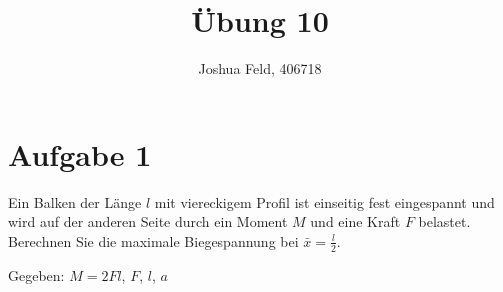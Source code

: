 \documentclass{exercise}
\institute{Lehr- und Forschungsgebiet Kontinuumsmechanik}
\title{Übung 10}
\author{Joshua Feld, 406718}
\begin{document}
    \maketitle


    \section*{Aufgabe 1}
    
    \begin{problem}
        Ein Balken der Länge \(l\) mit viereckigem Profil ist einseitig fest eingespannt und wird auf der anderen Seite durch ein Moment \(M\) und eine Kraft \(F\) belastet.
        Berechnen Sie die maximale Biegespannung bei \(\bar{x} = \frac{l}{2}\).
        \begin{center}
        \end{center}
        Gegeben: \(M = 2Fl\), \(F\), \(l\), \(a\)
    \end{problem}
    
\end{document}
